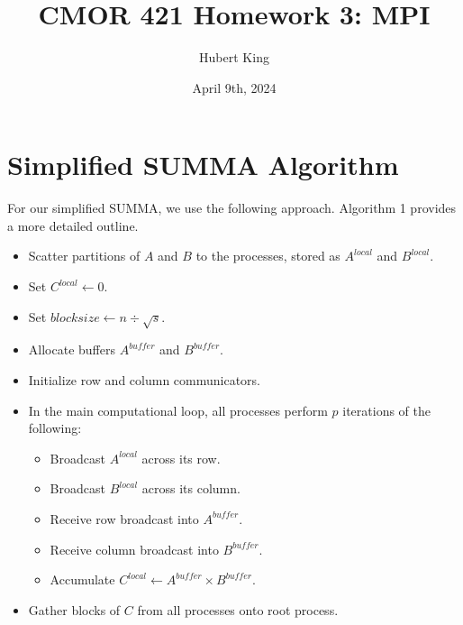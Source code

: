 \documentclass{article}
\title{CMOR 421 Homework 3: MPI}
\author{Hubert King}
\date{April 9th, 2024}
\begin{document}
\maketitle

\section{Simplified SUMMA Algorithm}
For our simplified SUMMA, we use the following approach. Algorithm 1 provides a more detailed outline.
\begin{itemize}
    \item Scatter partitions of $A$ and $B$ to the processes, stored as $A^{local}$ and $B^{local}$. 
    \item Set $C^{local} \gets 0$.   
    \item Set $blocksize \gets n \div \sqrt{s}$.
    \item Allocate buffers $A^{buffer}$ and $B^{buffer}$.
    \item Initialize row and column communicators.
    \item In the main computational loop, all processes perform $p$ iterations of the following: 
\begin{itemize}
    \item Broadcast $A^{local}$ across its row.
    \item Broadcast $B^{local}$ across its column.
    \item Receive row broadcast into $A^{buffer}$.
    \item Receive column broadcast into $B^{buffer}$.
    \item Accumulate $C^{local} \gets A^{buffer} \times B^{buffer}$.
\end{itemize} 
\item Gather blocks of $C$ from all processes onto root process.
\end{itemize}
\end{document}
